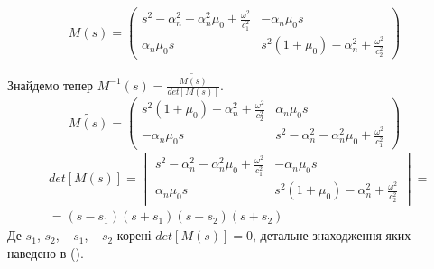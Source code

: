 \begin{equation}
    M(s) = \begin{pmatrix}
        s^2 - \alpha_n^2 - \alpha_n^2\mu_0 + \frac{\omega^2}{c_1^2} & -\alpha_n \mu_0 s \\
        \alpha_n \mu_0 s & s^2 (1 + \mu_0) -\alpha_n^2 + \frac{\omega^2}{c_2^2}
     \end{pmatrix}
\end{equation}

Знайдемо тепер $M^{-1}(s) = \frac{\widetilde{M(s)}}{det[M(s)]}$.
\begin{equation}
    \widetilde{M(s)} = \begin{pmatrix}
        s^2 (1 + \mu_0) -\alpha_n^2 + \frac{\omega^2}{c_2^2} & \alpha_n \mu_0 s \\
        -\alpha_n \mu_0 s & s^2 - \alpha_n^2 - \alpha_n^2\mu_0 + \frac{\omega^2}{c_1^2}
     \end{pmatrix}
\end{equation}
\begin{align}
    &det[M(s)] = \begin{vmatrix}
        s^2 - \alpha_n^2 - \alpha_n^2\mu_0 + \frac{\omega^2}{c_1^2} & -\alpha_n \mu_0 s \\
        \alpha_n \mu_0 s & s^2 (1 + \mu_0) -\alpha_n^2 + \frac{\omega^2}{c_2^2}
     \end{vmatrix} = \nonumber \\
    &=(s - s_1)(s + s_1)(s - s_2)(s + s_2)
\end{align}
Де $s_1$, $s_2$, $-s_1$, $-s_2$ корені $det[M(s)]=0$, детальне знаходження яких наведено в ().

